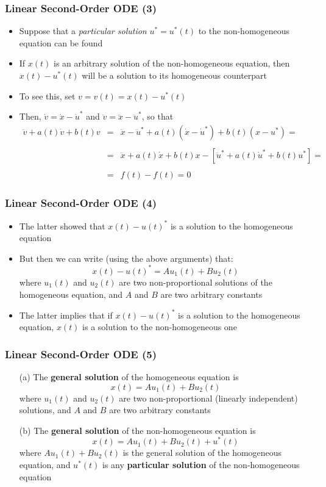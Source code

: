 \documentclass[10pt,usenames,dvipsnames]{beamer}
\theoremstyle{definition}
\begin{document}
\begin{frame}[fragile]
\frametitle{Linear Second-Order ODE (3)}
\begin{itemize}
	\item Suppose that a \textit{particular solution} $u^{*} = u^{*}(t)$ to the non-homogeneous equation can be found
	\item If $x(t)$ is an arbitrary solution of the non-homogeneous equation, then $x(t) - u^{*}(t)$ will be a solution to its homogeneous counterpart
	\item To see this, set $v = v(t) = x(t) - u^{*}(t)$
	\item Then, $\dot{v} = \dot{x} - \dot{u}^{*}$ and $\ddot{v} = \ddot{x} - \ddot{u}^{*}$, so that
	\[
		\begin{array}{lcl}
			\ddot{v} + a(t)\dot{v} + b(t)v & = & \ddot{x} - \ddot{u}^{*} + a(t)(\dot{x} - \dot{u}^{*}) + b(t)(x - u^{*}) = \\
			\quad\\
			& = & \ddot{x} + a(t)\dot{x} + b(t)x - [\ddot{u}^{*} + a(t)\dot{u}^{*} + b(t)u^{*}] = \\
			\quad\\
			& = & f(t) - f(t) = 0
		\end{array}
	\]
\end{itemize}
\end{frame}

\begin{frame}[fragile]
\frametitle{Linear Second-Order ODE (4)}
\begin{itemize}
	\item The latter showed that $x(t) - u(t)^{*}$ is a solution to the homogeneous equation
	\item But then we can write (using the above arguments) that:
	\[
		x(t) - u(t)^{*} = Au_{1}(t) + Bu_{2}(t)
	\]
	where $u_{1}(t)$ and $u_{2}(t)$ are two non-proportional solutions of the homogeneous equation, and $A$ and $B$ are two arbitrary constants
	\item The latter implies that if $x(t) - u(t)^{*}$ is a solution to the homogeneous equation, $x(t)$ is a solution to the non-homogeneous one
\end{itemize}
\end{frame}

\begin{frame}[fragile]
\frametitle{Linear Second-Order ODE (5)}
\begin{theorem}
	\begin{enumerate}
		\item[(a)] The \textbf{general solution} of the homogeneous equation is
		\[
			x(t) = Au_{1}(t) + Bu_{2}(t)
		\]
		where $u_{1}(t)$ and $u_{2}(t)$ are two non-proportional (linearly independent) solutions, and $A$ and $B$ are two arbitrary constants
		\item[(b)] The \textbf{general solution} of the non-homogeneous equation is
		\[
			x(t) = Au_{1}(t) + Bu_{2}(t) + u^{*}(t)
		\]
		where $Au_{1}(t) + Bu_{2}(t)$ is the general solution of the homogeneous equation, and $u^{*}(t)$ is any \textbf{particular solution} of the non-homogeneous equation
	\end{enumerate}
\end{theorem}
\end{frame}
\end{document}
